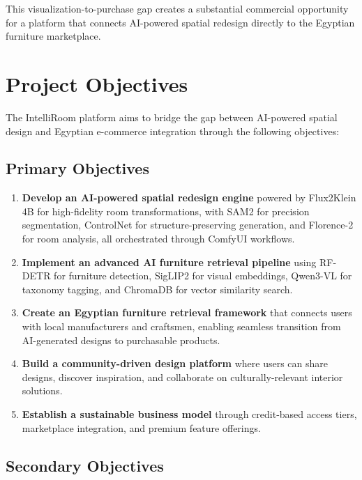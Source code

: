 This visualization-to-purchase gap creates a substantial commercial opportunity for a platform that connects AI-powered spatial redesign directly to the Egyptian furniture marketplace.

\section{Project Objectives}
\label{sec:objectives}

The IntelliRoom platform aims to bridge the gap between AI-powered spatial design and Egyptian e-commerce integration through the following objectives:

\subsection{Primary Objectives}

\begin{enumerate}
    \item \textbf{Develop an AI-powered spatial redesign engine} powered by Flux2Klein 4B for high-fidelity room transformations, with SAM2 for precision segmentation, ControlNet for structure-preserving generation, and Florence-2 for room analysis, all orchestrated through ComfyUI workflows.
    
    \item \textbf{Implement an advanced AI furniture retrieval pipeline} using RF-DETR for furniture detection, SigLIP2 for visual embeddings, Qwen3-VL for taxonomy tagging, and ChromaDB for vector similarity search.
    
    \item \textbf{Create an Egyptian furniture retrieval framework} that connects users with local manufacturers and craftsmen, enabling seamless transition from AI-generated designs to purchasable products.
    
    \item \textbf{Build a community-driven design platform} where users can share designs, discover inspiration, and collaborate on culturally-relevant interior solutions.
    
    \item \textbf{Establish a sustainable business model} through credit-based access tiers, marketplace integration, and premium feature offerings.
\end{enumerate}

\subsection{Secondary Objectives}

